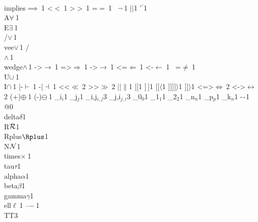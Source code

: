 {{        {\\implies}{{$\implies\ $}}1
        {<}{{$<\ $}}1
        {>}{{$>\ $}}1
        {=}{{$=\ $}}1
        {~}{{$\neg\ $}}1
        {|}{{$\mid$}}1
        {'}{{$^\prime$}}1
        {\\A}{{$\forall\ $}}1
        {\\E}{{$\exists\ $}}1
        {\\/}{{$\vee\,$}}1
        {\\vee}{{$\vee\,$}}1
        {/\\}{{$\wedge\,$}}1
        {\\wedge}{{$\wedge\,$}}1
        {->}{{$\rightarrow\ $}}1
        {=>}{{$\Rightarrow\ $}}1
        {->}{{$\rightarrow\ $}}1
        {<=}{{$\Leftarrow\ $}}1
        {<-}{{$\leftarrow\ $}}1
        {~=}{{$\neq\ $}}1
        {\\U}{{$\cup\ $}}1
        {\\I}{{$\cap\ $}}1
        {|-}{{$\vdash\ $}}1
        {-|}{{$\dashv\ $}}1
        {<<}{{$\ll\ $}}2
        {>>}{{$\gg\ $}}2
        {||}{{$\|$}}1
        {[}{{$[$}}1
        {]}{{$\,]$}}1
        {[[}{{$\langle$}}1
        {]]]}{{$]\rangle$}}1
        {]]}{{$\rangle$}}1
        {<=>}{{$\Leftrightarrow\ $}}2
        {<->}{{$\leftrightarrow\ $}}2
        {(+)}{{$\oplus\ $}}1
        {(-)}{{$\ominus\ $}}1
        {_i}{{$_{i}$}}1
        {_j}{{$_{j}$}}1
        {_{i,j}}{{$_{i,j}$}}3
        {_{j,i}}{{$_{j,i}$}}3
        {_0}{{$_0$}}1
        {_1}{{$_1$}}1
        {_2}{{$_2$}}1
        {_n}{{$_n$}}1
        {_p}{{$_p$}}1
        {_k}{{$_n$}}1
        {-}{{$\ms{-}$}}1
        {@}{{}}0
        {\\delta}{{$\delta$}}1
        {\\R}{{${\mathcal R}$}}1
        {\\Rplus}{{$\Rplus$}}1
        {\\N}{{${\mathcal N}$}}1
        {\\times}{{$\times\ $}}1
        {\\tau}{{$\tau$}}1
        {\\alpha}{{$\alpha$}}1
        {\\beta}{{$\beta$}}1
        {\\gamma}{{$\gamma$}}1
        {\\ell}{{$\ell\ $}}1
        {--}{{$-\ $}}1
        {\\TT}{{\hspace{1.5em}}}3
      }

}
